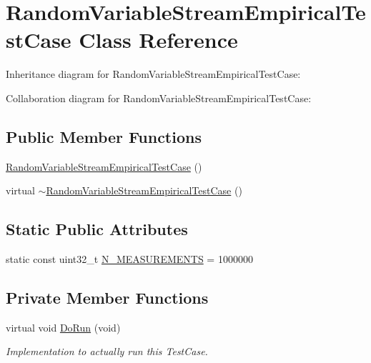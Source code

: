 \hypertarget{classRandomVariableStreamEmpiricalTestCase}{}\section{Random\+Variable\+Stream\+Empirical\+Test\+Case Class Reference}
\label{classRandomVariableStreamEmpiricalTestCase}


Inheritance diagram for Random\+Variable\+Stream\+Empirical\+Test\+Case\+:


Collaboration diagram for Random\+Variable\+Stream\+Empirical\+Test\+Case\+:
\subsection*{Public Member Functions}
\begin{DoxyCompactItemize}
\item 
\hyperlink{classRandomVariableStreamEmpiricalTestCase_ab2b87121492c58dce0b7c63891e8321e}{Random\+Variable\+Stream\+Empirical\+Test\+Case} ()
\item 
virtual \hyperlink{classRandomVariableStreamEmpiricalTestCase_a983fcdd40081c8e19c73a148d43694db}{$\sim$\+Random\+Variable\+Stream\+Empirical\+Test\+Case} ()
\end{DoxyCompactItemize}
\subsection*{Static Public Attributes}
\begin{DoxyCompactItemize}
\item 
static const uint32\+\_\+t \hyperlink{classRandomVariableStreamEmpiricalTestCase_af8f4a8c6d7df99808673e6bbde2d7ddc}{N\+\_\+\+M\+E\+A\+S\+U\+R\+E\+M\+E\+N\+TS} = 1000000
\end{DoxyCompactItemize}
\subsection*{Private Member Functions}
\begin{DoxyCompactItemize}
\item 
virtual void \hyperlink{classRandomVariableStreamEmpiricalTestCase_ad5071e15b94fe711389e8cbf52854852}{Do\+Run} (void)
\begin{DoxyCompactList}\small\item\em Implementation to actually run this Test\+Case. \end{DoxyCompactList}\end{DoxyCompactItemize}
